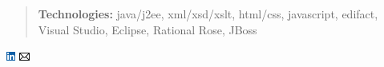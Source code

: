 \documentclass[
]{article}
\begin{document}
\begin{quote}
\textbf{Technologies:} java/j2ee, xml/xsd/xslt, html/css, javascript,
edifact, Visual Studio, Eclipse, Rational Rose, JBoss
\end{quote}

\includegraphics{linkedin-logo-11x11.png}
\includegraphics{email-icon-13x10.png}
\end{document}
